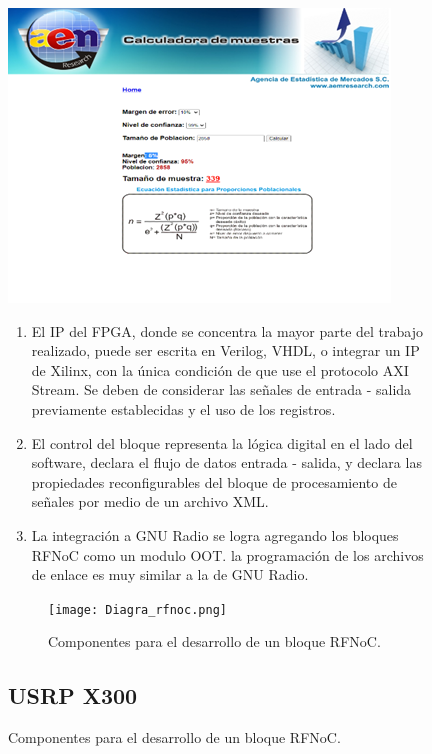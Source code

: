 \documentclass[12pt]{difu100cia} %
\begin{document}
\begin{figure}[!ht]
	\centering
	\includegraphics[width=\linewidth]{Figura 1.png}
	\caption{Muestra representativa del censo}
	\label{diagrama_estructura_rfnoc}
\begin{enumerate}
  \item El IP del FPGA, donde se concentra la mayor parte del trabajo realizado, puede ser escrita en Verilog, VHDL, o integrar un IP de Xilinx, con la única condición de que use el protocolo AXI Stream. Se deben de considerar las señales de entrada - salida previamente establecidas y el uso de los registros.  
  \item El control del bloque representa la lógica digital en el lado del software, declara el flujo de datos entrada - salida, y declara las propiedades reconfigurables del bloque de procesamiento de señales por medio de un archivo XML.  
  \item La integración a GNU Radio se logra agregando los bloques RFNoC como un modulo OOT.  la programación de los archivos de enlace es muy similar a la de GNU Radio.  
\end{enumerate}

\begin{figure}[!htb]
	\centering
	\texttt{[image: Diagra\_rfnoc.png]}
	\caption{Componentes para el desarrollo de un bloque RFNoC.}
	\label{diagrama_bloque_rfnoc}
\end{figure}

\subsection{USRP X300}


\end{figure}
\end{document}
